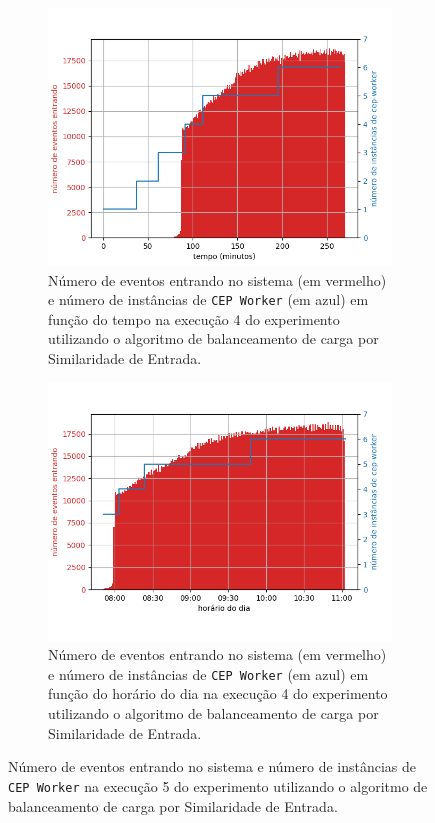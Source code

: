 \begin{figure}[h]
\centering
\begin{subfigure}{0.9\textwidth}
\centering
\includegraphics[width=\textwidth]{figuras/graphics/carga_e_workers_total9-dez-is.png}
\caption{Número de eventos entrando no sistema (em vermelho) e número de instâncias de \texttt{CEP Worker} (em azul) em função do tempo na execução 4 do experimento utilizando o algoritmo de balanceamento de carga por Similaridade de Entrada.}
\label{fig:workers_and_load_total-9-dez-is}
\end{subfigure}%

\begin{subfigure}{\textwidth}
\centering
\includegraphics[width=\textwidth]{figuras/graphics/carga_e_workers_horario9-dez-is.png}
\caption{Número de eventos entrando no sistema (em vermelho) e número de instâncias de \texttt{CEP Worker} (em azul) em função do horário do dia na execução 4 do experimento utilizando o algoritmo de balanceamento de carga por Similaridade de Entrada.}
\label{fig:workers_and_load_SPtrans-9-dez-is}
\end{subfigure}%
\caption{Número de eventos entrando no sistema e número de instâncias de \texttt{CEP Worker} na execução 5 do experimento utilizando o algoritmo de balanceamento de carga por Similaridade de Entrada.}
\end{figure}






